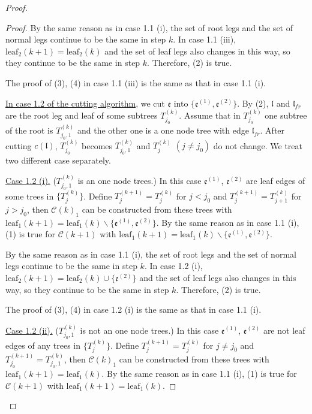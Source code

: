 \begin{proof}
\begin{proof}
By the same reason as in case 1.1 (i), the set of root legs and the set of normal legs continue to be the same in step $k$. In case 1.1 (iii), $\text{leaf}_2(k+1)=\text{leaf}_2(k)$ and the set of leaf legs also changes in this way, so they continue to be the same in step $k$. Therefore, (2) is true.

The proof of (3), (4) in case 1.1 (iii) is the same as that in case 1.1 (i).

\underline{In case 1.2 of the cutting algorithm}, we cut $\mathfrak{e}$ into $\{\mathfrak{e}^{(1)},\mathfrak{e}^{(2)}\}$. By (2), $\mathfrak{l}$ and $\mathfrak{l}_{fr}$ are the root leg and leaf of some subtrees $T^{(k)}_{j_0}$. Assume that in $T^{(k)}_{j_0}$ one subtree of the root is $T^{(k)}_{j_0,1}$ and the other one is a one node tree with edge $\mathfrak{l}_{fr}$. After cutting $c(\mathfrak{l})$, $T^{(k)}_{j_0}$ becomes $T^{(k)}_{j_0,1}$ and $T^{(k)}_{j}$ $(j\ne j_0)$ do not change. 
We treat two different case separately.

\underline{Case 1.2 (i).} ($T^{(k)}_{j_0,1}$ is an one node trees.) In this case $\mathfrak{e}^{(1)}$, $\mathfrak{e}^{(2)}$ are leaf edges of some trees in $\{T_{j}^{(k)}\}$. Define $T^{(k+1)}_{j}=T^{(k)}_{j}$ for $j< j_0$ and $T^{(k+1)}_{j}=T^{(k)}_{j+1}$ for $j> j_0$, then $\mathcal{C}(k)_1$ can be constructed from these trees with  $\text{leaf}_1(k+1)=\text{leaf}_1(k)\backslash\{\mathfrak{e}^{(1)}, \mathfrak{e}^{(2)}\}$. By the same reason as in case 1.1 (i), (1) is true for $\mathcal{C}(k+1)$ with $\text{leaf}_1(k+1)=\text{leaf}_1(k)\backslash\{\mathfrak{e}^{(1)}, \mathfrak{e}^{(2)}\}$.

By the same reason as in case 1.1 (i), the set of root legs and the set of normal legs continue to be the same in step $k$. In case 1.2 (i), $\text{leaf}_2(k+1)=\text{leaf}_2(k)\cup \{ \mathfrak{e}^{(2)}\}$ and the set of leaf legs also changes in this way, so they continue to be the same in step $k$. Therefore, (2) is true.

The proof of (3), (4) in case 1.2 (i) is the same as that in case 1.1 (i).


\underline{Case 1.2 (ii).} ($T^{(k)}_{j_0,1}$ is not an one node trees.) In this case $\mathfrak{e}^{(1)}$, $\mathfrak{e}^{(2)}$ are not leaf edges of any trees in $\{T_{j}^{(k)}\}$. Define $T^{(k+1)}_{j}=T^{(k)}_{j}$ for $j\ne j_0$ and $T^{(k+1)}_{j_0}=T^{(k)}_{j_0,1}$, then $\mathcal{C}(k)_1$ can be constructed from these trees with  $\text{leaf}_1(k+1)=\text{leaf}_1(k)$. By the same reason as in case 1.1 (i), (1) is true for $\mathcal{C}(k+1)$ with $\text{leaf}_1(k+1)=\text{leaf}_1(k)$.


\end{proof}
\end{proof}
